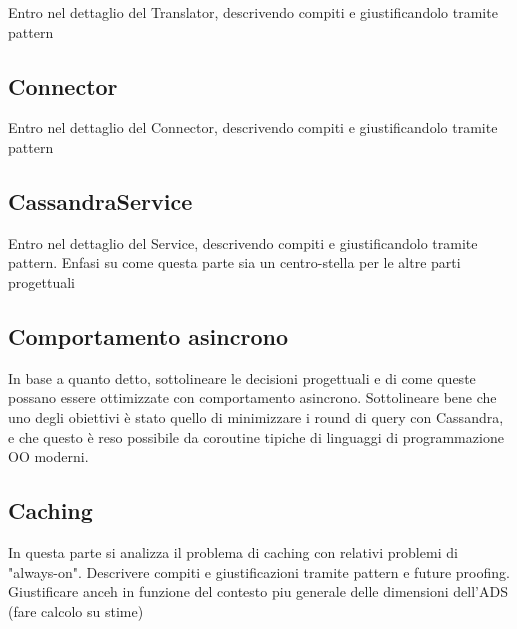 		Entro nel dettaglio del Translator, descrivendo compiti e giustificandolo tramite pattern
		
	\subsection{Connector}
	
		Entro nel dettaglio del Connector, descrivendo compiti e giustificandolo tramite pattern
	
	\subsection{CassandraService}
	
		Entro nel dettaglio del Service, descrivendo compiti e giustificandolo tramite pattern.
		Enfasi su come questa parte sia un centro-stella per le altre parti progettuali
		
	\subsection{Comportamento asincrono}
	
		In base a quanto detto, sottolineare le decisioni progettuali e di come queste possano essere ottimizzate con
		comportamento asincrono. Sottolineare bene che uno degli obiettivi è stato quello di minimizzare i round di 
		query con Cassandra, e che questo è reso possibile da coroutine tipiche di linguaggi di programmazione OO moderni.
			
	\subsection{Caching}
	
		In questa parte si analizza il problema di caching con relativi problemi di "always-on". Descrivere compiti e giustificazioni
		tramite pattern e future proofing. Giustificare anceh in funzione del contesto piu generale delle dimensioni dell'ADS (fare calcolo su stime)